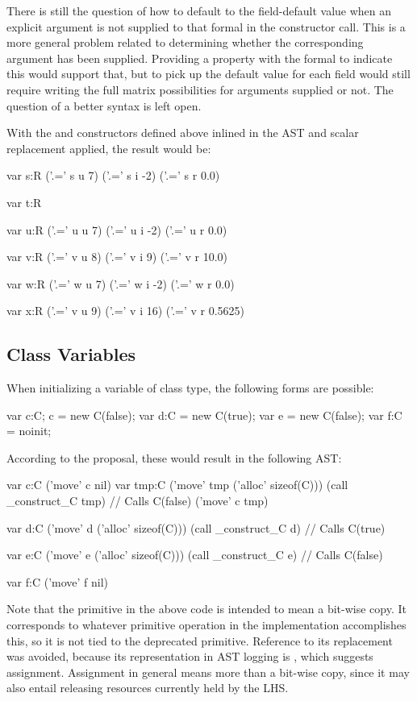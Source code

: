 There is still the question of how to default to the field-default value when an explicit
argument is not supplied to that formal in the constructor call.  This is a more general
problem related to determining whether the corresponding argument has been supplied.
Providing a property with the formal to indicate this would support that, but to pick up
the default value for each field would still require writing the full matrix
possibilities for arguments supplied or not.  The question of a better syntax is left open.

With the  and constructors defined above inlined in the AST and scalar
replacement applied, the result would be:
\begin{numberedchapel}
  var s:R
  ('.=' s u 7)
  ('.=' s i -2)
  ('.=' s r 0.0)

  var t:R

  var u:R
  ('.=' u u 7)
  ('.=' u i -2)
  ('.=' u r 0.0)

  var v:R
  ('.=' v u 8)
  ('.=' v i 9)
  ('.=' v r 10.0)

  var w:R
  ('.=' w u 7)
  ('.=' w i -2)
  ('.=' w r 0.0)

  var x:R
  ('.=' v u 9)
  ('.=' v i 16)
  ('.=' v r 0.5625)
\end{numberedchapel}


\subsection{Class Variables}
When initializing a variable of class type, the following forms are possible:
\begin{chapel}
  var c:C; c = new C(false);
  var d:C = new C(true);
  var e = new C(false);
  var f:C = noinit;
\end{chapel}
\noindent
According to the proposal, these would result in the following AST:
\begin{numberedchapel}
  var c:C
  ('move' c nil)
  var tmp:C
  ('move' tmp ('alloc' sizeof(C)))
  (call _construct_C tmp) // Calls C(false)
  ('move' c tmp)

  var d:C
  ('move' d ('alloc' sizeof(C)))
  (call _construct_C d) // Calls C(true)

  var e:C
  ('move' e ('alloc' sizeof(C)))
  (call _construct_C e) // Calls C(false)

  var f:C
  ('move' f nil)
\end{numberedchapel}
\noindent
Note that the primitive  in the above code is intended to mean a bit-wise
copy.  It corresponds to whatever primitive operation in the implementation accomplishes
this, so it is not tied to the deprecated  primitive.  Reference to its
replacement  was avoided, because its representation in AST logging is
, which suggests assignment.  Assignment in general means more than a
bit-wise copy, since it may also entail releasing resources currently held by the LHS.

